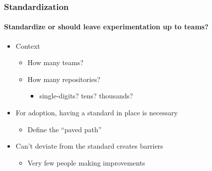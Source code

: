 
\begin{frame}
  \frametitle{Standardization}
  \framesubtitle{Standardize or should leave experimentation up to teams?}

  \begin{itemize}
    \pause
    \item Context
    \begin{itemize}
      \item How many teams?
      \item How many repositories?
        \begin{itemize}
          \item single-digits? tens? thousands?
        \end{itemize}
    \end{itemize}
    \pause
    \item For adoption, having a standard in place is necessary
      \begin{itemize}
        \item Define the ``paved path''
      \end{itemize}
    \pause
    \item Can't deviate from the standard creates barriers
      \begin{itemize}
        \item Very few people making improvements
      \end{itemize}
  \end{itemize}

\end{frame}
